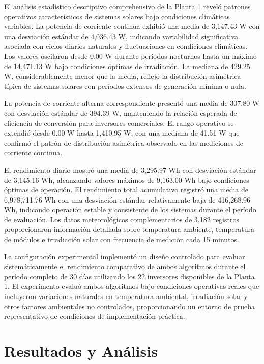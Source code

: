 \documentclass[12pt,a4paper]{article}
\begin{document}
El análisis estadístico descriptivo comprehensivo de la Planta 1 reveló patrones operativos característicos de sistemas solares bajo condiciones climáticas variables. La potencia de corriente continua exhibió una media de 3,147.43 W con una desviación estándar de 4,036.43 W, indicando variabilidad significativa asociada con ciclos diarios naturales y fluctuaciones en condiciones climáticas. Los valores oscilaron desde 0.00 W durante períodos nocturnos hasta un máximo de 14,471.13 W bajo condiciones óptimas de irradiación. La mediana de 429.25 W, considerablemente menor que la media, reflejó la distribución asimétrica típica de sistemas solares con períodos extensos de generación mínima o nula.

La potencia de corriente alterna correspondiente presentó una media de 307.80 W con desviación estándar de 394.39 W, manteniendo la relación esperada de eficiencia de conversión para inversores comerciales. El rango operativo se extendió desde 0.00 W hasta 1,410.95 W, con una mediana de 41.51 W que confirmó el patrón de distribución asimétrica observado en las mediciones de corriente continua.

El rendimiento diario mostró una media de 3,295.97 Wh con desviación estándar de 3,145.16 Wh, alcanzando valores máximos de 9,163.00 Wh bajo condiciones óptimas de operación. El rendimiento total acumulativo registró una media de 6,978,711.76 Wh con una desviación estándar relativamente baja de 416,268.96 Wh, indicando operación estable y consistente de los sistemas durante el período de evaluación. Los datos meteorológicos complementarios de 3,182 registros proporcionaron información detallada sobre temperatura ambiente, temperatura de módulos e irradiación solar con frecuencia de medición cada 15 minutos.

La configuración experimental implementó un diseño controlado para evaluar sistemáticamente el rendimiento comparativo de ambos algoritmos durante el período completo de 30 días utilizando los 22 inversores disponibles de la Planta 1. El experimento evaluó ambos algoritmos bajo condiciones operativas reales que incluyeron variaciones naturales en temperatura ambiental, irradiación solar y otros factores ambientales no controlados, proporcionando un entorno de prueba representativo de condiciones de implementación práctica.

\section{Resultados y Análisis}
\end{document}
